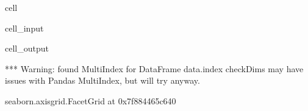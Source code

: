 \documentclass[letterpaper,table,10pt,english]{jupyterBook}
\begin{document}
\begin{sphinxuseclass}{cell}\begin{sphinxVerbatimInput}

\begin{sphinxuseclass}{cell_input}
\begin{sphinxVerbatim}[commandchars=\\\{\}]
  
     
                 
                     
\end{sphinxVerbatim}

\end{sphinxuseclass}\end{sphinxVerbatimInput}
\begin{sphinxVerbatimOutput}

\begin{sphinxuseclass}{cell_output}
\begin{sphinxVerbatim}[commandchars=\\\{\}]
*** Warning: found MultiIndex for DataFrame data.index \PYGZhy{} checkDims may have issues with Pandas MultiIndex, but will try anyway.
\end{sphinxVerbatim}

\begin{sphinxVerbatim}[commandchars=\\\{\}]
\PYGZlt{}seaborn.axisgrid.FacetGrid at 0x7f884465c640\PYGZgt{}
\end{sphinxVerbatim}

\noindent{}

\end{sphinxuseclass}\end{sphinxVerbatimOutput}

\end{sphinxuseclass}
\end{document}
